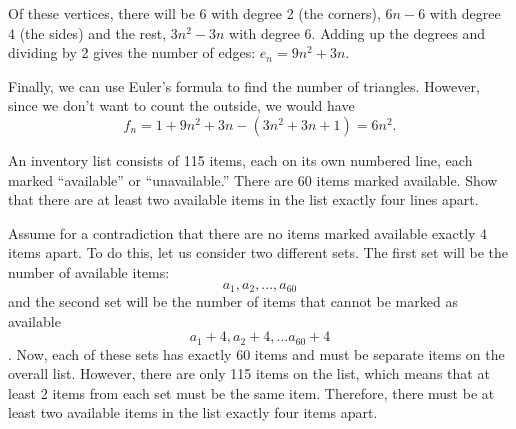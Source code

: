 \begin{questions}
\begin{solution}
  Of these vertices, there will be 6 with degree 2 (the corners), $6n-6$ with degree 4 (the sides) and the rest, $3n^2 - 3n$ with degree 6.  Adding up the degrees and dividing by 2 gives the number of edges: $e_n = 9n^2 + 3n$.

  Finally, we can use Euler's formula to find the number of triangles.  However, since we don't want to count the outside, we would have
  \[f_n = 1 + 9n^2 + 3n - (3n^2 + 3n + 1) = 6n^2.\]
\end{solution}


\question[4] An inventory list consists of 115 items, each on its own numbered line, each marked ``available'' or ``unavailable.'' There are 60 items marked available. Show that there are at least two available items in the list exactly four lines apart.
\begin{solution}
	Assume for a contradiction that there are no items marked available exactly 4 items apart. To do this, let us consider two different sets. The first set will be the number of available items: \[a_1,a_2,...,a_60\] and the second set will be the number of items that cannot be marked as available \[a_1+4,a_2+4,...a_{60}+4\]. Now, each of these sets has exactly 60 items and must be separate items on the overall list. However, there are only 115 items on the list, which means that at least 2 items from each set must be the same item. Therefore, there must be at least two available items in the list exactly four items apart.
\end{solution}












\end{questions}
